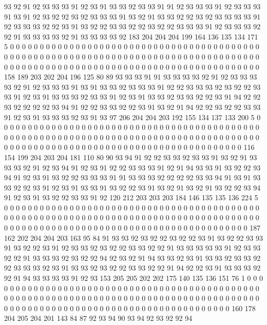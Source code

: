 93 92 91 92 93 93 93 91 92 93 91 93 93 92 93 93 91 91 92 93
93 93 91 92 93 93 93 91 93 91 92 93 92 92 93 92 93 93 93 91
93 92 91 93 93 92 92 93 92 93 93 93 93 91 92 93 93 93 92 92
93 91 93 92 92 93 93 92 92 93 92 92 93 93 93 91 92 93 93 93
92 92 91 93 93 93 93 92 91 93 93 93 93 92 183 204 204 204 199 164
136 135 134 171 5 0 0 0 0 0 0 0 0 0 0 0 0 0 0 0
0 0 0 0 0 0 0 0 0 0 0 0 0 0 0 0 0 0 0 0
0 0 0 0 0 0 0 0 0 0 0 0 0 0 0 0 0 0 0 0
0 0 0 0 0 0 0 0 0 0 0 0 0 0 0 0 0 0 0 0
0 0 0 0 0 0 0 0 0 0 0 0 0 0 0 0 0 0 0 0
0 0 0 0 0 0 0 0 0 0 0 0 0 0 0 0 0 0 0 0
0 0 0 0 0 0 0 0 0 0 0 0 0 158 189 203 202 204 196 125
80 89 93 93 93 91 91 93 93 93 93 92 91 92 93 93 93 93 92 91
92 93 93 93 91 93 91 93 93 92 93 93 93 91 92 92 93 93 93 92
93 92 92 93 93 91 92 93 91 93 93 93 92 93 93 91 92 93 91 93
93 92 93 93 92 92 93 91 94 92 92 93 92 92 92 92 93 94 91 92
92 93 93 92 92 93 91 93 92 91 94 92 92 93 92 92 93 93 91 92
93 91 93 93 93 92 93 91 93 97 206 204 204 203 192 155 134 137 133 200
5 0 0 0 0 0 0 0 0 0 0 0 0 0 0 0 0 0 0 0
0 0 0 0 0 0 0 0 0 0 0 0 0 0 0 0 0 0 0 0
0 0 0 0 0 0 0 0 0 0 0 0 0 0 0 0 0 0 0 0
0 0 0 0 0 0 0 0 0 0 0 0 0 0 0 0 0 0 0 0
0 0 0 0 0 0 0 0 0 0 0 0 0 0 0 0 0 0 0 0
0 0 0 0 0 0 0 0 0 0 0 0 0 0 0 0 0 0 0 0
0 0 0 0 0 0 0 0 116 154 199 204 203 204 181 110 80 90 93 94
91 92 92 93 93 92 93 93 91 93 92 91 93 93 93 92 91 92 93 94
91 92 93 91 92 92 93 93 93 91 92 91 94 93 93 91 93 92 92 93
94 91 92 93 91 93 92 92 93 93 93 91 91 93 93 93 92 92 92 92
93 93 94 91 93 91 93 93 92 92 93 91 92 93 91 93 93 91 93 92
92 93 91 93 92 91 93 92 91 93 92 92 93 94 91 92 93 91 93 92
92 93 93 91 92 120 212 203 203 203 184 146 135 135 136 224 5 0 0 0
0 0 0 0 0 0 0 0 0 0 0 0 0 0 0 0 0 0 0 0
0 0 0 0 0 0 0 0 0 0 0 0 0 0 0 0 0 0 0 0
0 0 0 0 0 0 0 0 0 0 0 0 0 0 0 0 0 0 0 0
0 0 0 0 0 0 0 0 0 0 0 0 0 0 0 0 0 0 0 0
0 0 0 0 0 0 0 0 0 0 0 0 0 0 0 0 0 0 0 0
0 0 0 0 0 0 0 0 0 0 0 0 0 0 0 0 0 0 0 0
0 0 0 0 187 162 202 204 204 203 163 95 84 91 93 93 92 93 92 92
93 92 92 93 91 93 92 92 93 93 91 93 92 92 93 91 92 93 93 92
93 92 92 93 93 92 92 91 93 93 93 93 93 91 92 93 93 92 92 91
93 93 93 92 93 92 92 94 92 93 92 91 94 93 93 92 93 91 93 93
92 93 93 92 92 93 93 93 92 93 91 93 93 92 93 92 92 93 93 92
92 91 94 92 92 93 91 93 93 93 92 92 91 94 93 93 93 93 91 92
93 153 205 205 202 202 175 140 135 136 151 76 1 0 0 0 0 0 0 0
0 0 0 0 0 0 0 0 0 0 0 0 0 0 0 0 0 0 0 0
0 0 0 0 0 0 0 0 0 0 0 0 0 0 0 0 0 0 0 0
0 0 0 0 0 0 0 0 0 0 0 0 0 0 0 0 0 0 0 0
0 0 0 0 0 0 0 0 0 0 0 0 0 0 0 0 0 0 0 0
0 0 0 0 0 0 0 0 0 0 0 0 0 0 0 0 0 0 0 0
0 0 0 0 0 0 0 0 0 0 0 0 0 0 0 0 0 0 0 0
160 178 204 205 204 201 143 84 87 92 93 94 90 93 94 92 93 92 92 94
